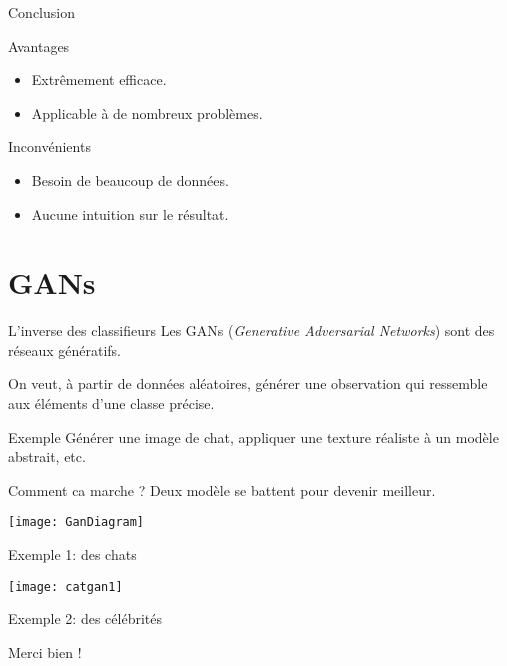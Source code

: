\documentclass[serif]{beamer} %
\theoremstyle{definition}
\theoremstyle{remark}
\begin{document}
\begin{frame}{Conclusion}
	\begin{block}{Avantages}
		\begin{itemize}
			\pause
			\item Extrêmement efficace.
			\pause
			\item Applicable à de nombreux problèmes.
		\end{itemize}
	\end{block}
	\pause
	\begin{block}{Inconvénients}
		\begin{itemize}
			\pause
			\item Besoin de beaucoup de données.
			\pause
			\item Aucune intuition sur le résultat.
		\end{itemize}
	\end{block}
\end{frame}

\section{GANs}
\begin{frame}
\tableofcontents[currentsection]
\end{frame}
\begin{frame}{L'inverse des classifieurs}
	Les GANs (\textit{Generative Adversarial Networks}) sont des réseaux génératifs.
	
	On veut, à partir de données aléatoires, générer une observation qui ressemble aux éléments d'une classe précise.
	
	\begin{block}{Exemple}
		Générer une image de chat, appliquer une texture réaliste à un modèle abstrait, etc.
	\end{block}
\end{frame}

\begin{frame}{Comment ca marche ?}
	Deux modèle se battent pour devenir meilleur.
	\begin{center}
		\texttt{[image: GanDiagram]}
	\end{center}
\end{frame}

\begin{frame}{Exemple 1: des chats}
\begin{center}
	\texttt{[image: catgan1]}
\end{center}
\end{frame}
\begin{frame}{Exemple 2: des célébrités}
	
\end{frame}

\begin{frame}
\begin{center}
	\Huge{Merci bien !}
\end{center}
	
\end{frame}
\end{document}

